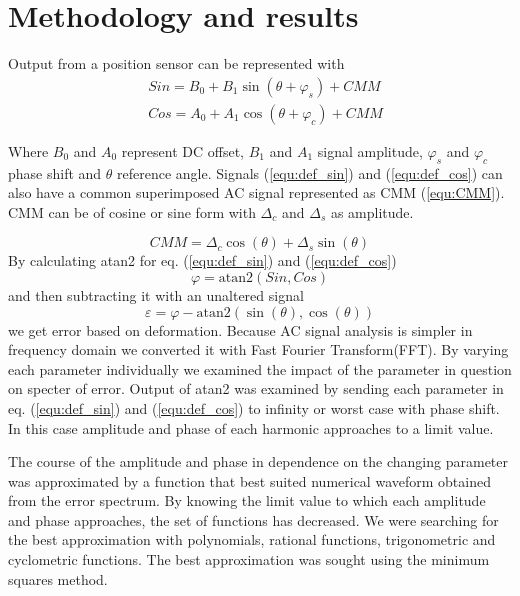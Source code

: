 \documentclass[a4paper]{article}
\begin{document}
\section{Methodology and results}
Output from a position sensor can be represented with
\begin{eqnarray}
\label{equ:def_sin}
&Sin = B_{0} + B_1 \sin(\theta + \varphi_{s}) + CMM\\
\label{equ:def_cos}
&Cos = A_{0} + A_1 \cos(\theta + \varphi_{c}) + CMM
\end{eqnarray}

Where $B_0$ and $A_0$ represent DC offset, $B_1$ and $A_1$ signal amplitude, $\varphi_s$ and $\varphi_c$  phase shift and $\theta$ reference angle. Signals (\ref{equ:def_sin}) and (\ref{equ:def_cos}) can also have a common superimposed AC signal  represented as CMM (\ref{equ:CMM}). CMM can be of cosine or sine form with $\Delta_c$ and $\Delta_s$ as amplitude.

\begin{equation}
\label{equ:CMM}
CMM = \Delta_c \cos(\theta)+\Delta_s \sin(\theta)
\end{equation}
By calculating atan2 for eq. (\ref{equ:def_sin}) and (\ref{equ:def_cos})
\begin{equation}
\label{equ:def_kot}
\varphi = \mathrm{atan2}(Sin,Cos)
\end{equation}
and then subtracting it with an unaltered signal
\begin{equation}
\label{equ:def_err}
\varepsilon =\varphi - \mathrm{atan2}(\sin(\theta),\cos(\theta))
\end{equation}
we get error based on deformation. Because  AC signal analysis is simpler in frequency domain we converted it with Fast Fourier Transform(FFT). By varying each parameter individually we examined the impact of the parameter in question on specter of error. Output of atan2 was examined by sending each parameter in eq. (\ref{equ:def_sin}) and (\ref{equ:def_cos}) to infinity or worst case with phase shift.
In this case amplitude and phase of each harmonic approaches to a limit value.

The course of the amplitude and phase in dependence on the changing parameter was approximated by a function that best suited numerical waveform obtained from the error spectrum. By knowing the limit value to which each amplitude and phase approaches, the set of functions has decreased. We were searching for the best approximation with polynomials, rational functions, trigonometric and cyclometric functions. The best approximation was sought using the minimum squares method.
\end{document}
